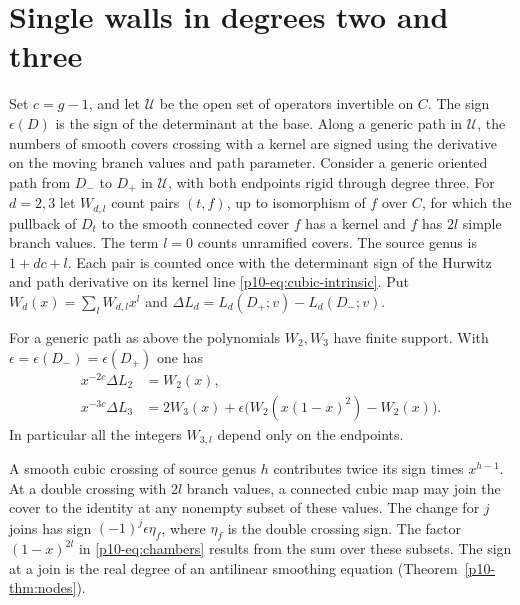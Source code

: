 \section{Single walls in degrees two and three}\label{sec:chamber-statement}
Set \(c=g-1\), and let \(\mathcal U\) be the open set of operators invertible on \(C\). The sign \(\epsilon(D)\) is the sign of the determinant at the base. Along a generic path in \(\mathcal U\), the numbers of smooth covers crossing with a kernel are signed using the derivative on the moving branch values and path parameter.
Consider a generic oriented path from $D_-$ to $D_+$ in $\mathcal U$,
with both endpoints rigid through degree three. For $d=2,3$ let
$W_{d,l}$ count pairs $(t,f)$, up to isomorphism of $f$ over $C$,
for which the pullback of $D_t$ to the smooth connected cover $f$
has a kernel and $f$ has $2l$ simple branch values. The term $l=0$
counts unramified covers. The source genus is $1+dc+l$.
Each pair is counted once with the determinant sign of the
Hurwitz and path derivative on its kernel line
\eqref{p10-eq:cubic-intrinsic}. Put $W_d(x)=\sum_l W_{d,l}x^l$ and
$\Delta L_d=L_d(D_+;v)-L_d(D_-;v)$.

\begin{theorem}\label{p10-thm:chambers}
For a generic path as above the polynomials $W_2,W_3$ have finite
support. With $\epsilon=\epsilon(D_-)=\epsilon(D_+)$ one has
\begin{equation}\label{p10-eq:chambers}
\begin{aligned}
 x^{-2c}\Delta L_2 &= W_2(x),\\
 x^{-3c}\Delta L_3 &= 2W_3(x)
        +\epsilon\bigl(W_2(x(1-x)^2)-W_2(x)\bigr).
\end{aligned}
\end{equation}
In particular all the integers $W_{3,l}$ depend only on the endpoints.
\end{theorem}

A smooth cubic crossing of source genus $h$ contributes twice its
sign times $x^{h-1}$. At a double crossing with $2l$ branch values,
a connected cubic map may join the cover to the identity at any
nonempty subset of these values. The change for $j$ joins has sign
$(-1)^j\epsilon\eta_f$, where $\eta_f$ is the double crossing sign.
The factor $(1-x)^{2l}$ in \eqref{p10-eq:chambers} results from the sum over
these subsets. The sign at a join is the real degree of an antilinear
smoothing equation (Theorem~\ref{p10-thm:nodes}).


